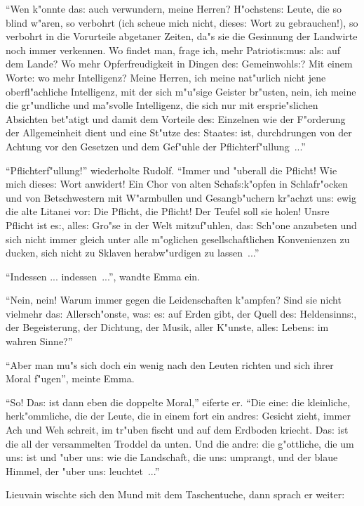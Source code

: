 \documentclass[oneside,12pt]{book}
\newcommand{\s}{s:}%
\begin{document}
"`Wen k"onnte da{\s} auch verwundern, meine Herren? H"ochsten{\s}
Leute, die so blind w"aren, so verbohrt (ich scheue mich nicht,
diese{\s} Wort zu gebrauchen!), so verbohrt in die Vorurteile
abgetaner Zeiten, da"s sie die Gesinnung der Landwirte noch immer
verkennen. Wo findet man, frage ich, mehr Patrioti{\s}mu{\s}
al{\s} auf dem Lande? Wo mehr Opferfreudigkeit in Dingen de{\s}
Gemeinwohl{\s}? Mit einem Worte: wo mehr Intelligenz? Meine
Herren, ich meine nat"urlich nicht jene oberfl"achliche
Intelligenz, mit der sich m"u"sige Geister br"usten, nein, ich
meine die gr"undliche und ma"svolle Intelligenz, die sich nur mit
ersprie"slichen Absichten bet"atigt und damit dem Vorteile de{\s}
Einzelnen wie der F"orderung der Allgemeinheit dient und eine
St"utze de{\s} Staate{\s} ist, durchdrungen von der Achtung vor
den Gesetzen und dem Gef"uhle der Pflichterf"ullung~..."'

"`Pflichterf"ullung!"' wiederholte Rudolf. "`Immer und "uberall
die Pflicht! Wie mich diese{\s} Wort anwidert! Ein Chor von alten
Schaf{\s}\-k"opfen in Schlaf\-r"ocken und von Betschwestern mit
W"armbullen und Gesangb"uchern kr"achzt un{\s} ewig die alte
Litanei vor: {\glq}Die Pflicht, die Pflicht!{\grq} Der Teufel soll
sie holen! Unsre Pflicht ist e{\s}, alle{\s} Gro"se in der Welt
mit\/zuf"uhlen, da{\s} Sch"one anzubeten und sich nicht immer gleich
unter alle m"oglichen gesellschaftlichen Konvenienzen zu ducken,
sich nicht zu Sklaven herabw"urdigen zu lassen~..."'

"`Indessen ... indessen~..."', wandte Emma ein.

"`Nein, nein! Warum immer gegen die Leidenschaften k"ampfen? Sind
sie nicht vielmehr da{\s} Allersch"onste, wa{\s} e{\s} auf Erden
gibt, der Quell de{\s} Heldensinn{\s}, der Begeisterung, der
Dichtung, der Musik, aller K"unste, alle{\s} Leben{\s} im wahren
Sinne?"'

"`Aber man mu"s sich doch ein wenig nach den Leuten richten und
sich ihrer Moral f"ugen"', meinte Emma.

"`So! Da{\s} ist dann eben die doppelte Moral,"' eiferte er. "`Die
eine: die kleinliche, herk"ommliche, die der Leute, die in einem
fort ein andre{\s} Gesicht zieht, immer Ach und Weh schreit, im
tr"uben fischt und auf dem Erdboden kriecht. Da{\s} ist die all
der versammelten Troddel da unten. Und die andre: die g"ottliche,
die um un{\s} ist und "uber un{\s} wie die Landschaft, die un{\s}
umprangt, und der blaue Himmel, der "uber un{\s} leuchtet~..."'

Lieuvain wischte sich den Mund mit dem Taschentuche, dann sprach
er weiter:
\end{document}
